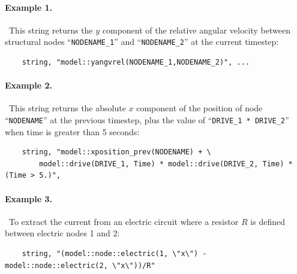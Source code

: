 \paragraph{Example 1.} \
This string returns the $y$ component of the relative angular velocity between structural nodes ``\verb;NODENAME_1;'' and ``\verb;NODENAME_2;'' at the current timestep:
\begin{verbatim}
    string, "model::yangvrel(NODENAME_1,NODENAME_2)", ...
\end{verbatim}

\paragraph{Example 2.} \
This string returns the absolute $x$ component of the position of node ``\verb;NODENAME;'' at the previous timestep, plus the value of ``\verb;DRIVE_1 * DRIVE_2;'' when time is greater than 5 seconds:
\begin{verbatim}
    string, "model::xposition_prev(NODENAME) + \
        model::drive(DRIVE_1, Time) * model::drive(DRIVE_2, Time) * (Time > 5.)",
\end{verbatim}

\paragraph{Example 3.} \
To extract the current from an electric circuit where a resistor $R$ is defined between electric nodes 1 and 2:
\begin{verbatim}
    string, "(model::node::electric(1, \"x\") - model::node::electric(2, \"x\"))/R"
\end{verbatim}



